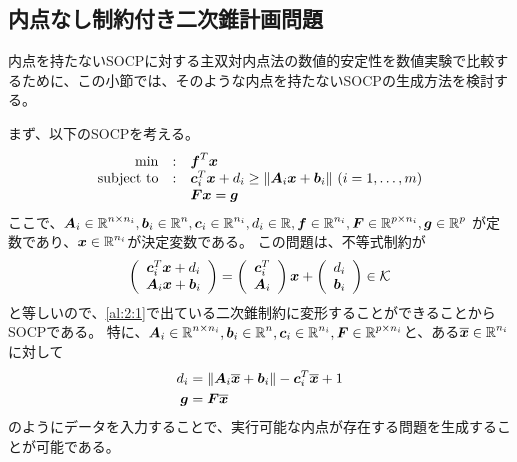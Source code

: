 \documentclass[11pt,a4paper,dvipdfmx,titlepage,uplatex]{jsarticle}
\theoremstyle{mystyle}
\newcommand{\0}{\mathbf{0}}
\def\b{\mbox{\boldmath $b$}}
\def\c{\mbox{\boldmath $c$}}
\def\f{\mbox{\boldmath $f$}}
\def\g{\mbox{\boldmath $g$}}
\def\x{\mbox{\boldmath $x$}}
\def\A{\mbox{\boldmath $A$}}
\def\F{\mbox{\boldmath $F$}}
\def\KC{\mbox{$\cal K$}}
\def\Real{\mbox{$\mathbb{R}$}}
\begin{document}
\subsection{内点なし制約付き二次錐計画問題}\label{sec:Second_Order_Cone_Programming_without_interiorpoint}

内点を持たないSOCPに対する主双対内点法の数値的安定性を数値実験で比較するために、この小節では、そのような内点を持たないSOCPの生成方法を検討する。

まず、以下のSOCPを考える。
\begin{align}
	\begin{array}{rcl}
		\min & : & \f^T \x \\
		\text{subject to} & : & \c_i^T \x + d_i \ge \|\A_i \x + \b_i\|
		\ (i=1, \ldots, m) \\
		& & \F \x = \g
	\end{array}
\end{align}
ここで、$\A_i \in \Real^{n \times n_i}, \b_i \in \Real^{n}, \c_i \in \Real^{n_i}, d_i \in \Real, \f \in \Real^{n_i} , \F \in \Real^{p \times n_i}, \g \in \Real^p$
が定数であり、$\x \in \Real^{n_i}$が決定変数である。
この問題は、不等式制約が
\begin{align}
  \left(
  \begin{array}{c}
    \c_i^T \x + d_i \\
    \A_i \x + \b_i
  \end{array}
  \right) = \left(
  \begin{array}{c}
    \c_i^T \\
    \A_i
  \end{array}
  \right) \x + \left(
  \begin{array}{c}
    d_i \\
    \b_i
  \end{array}
  \right) \in \KC
\end{align}
と等しいので、\eqref{al:2:1}で出ている二次錐制約に変形することができることからSOCPである。
特に、$\A_i \in \Real^{n \times n_i}, \b_i \in \Real^{n},
\c_i \in \Real^{n_i}, \F \in \Real^{p \times n_i}$と、ある$\overline{\x} \in \Real^{n_i}$に対して
\begin{align}
  d_i &= \|\A_i \overline{\x} + \b_i\| - \c_i^T \overline{\x} + 1 \\
  \g &= \F \overline{\x}
\end{align}
のようにデータを入力することで、実行可能な内点が存在する問題を生成することが可能である。
\end{document}

